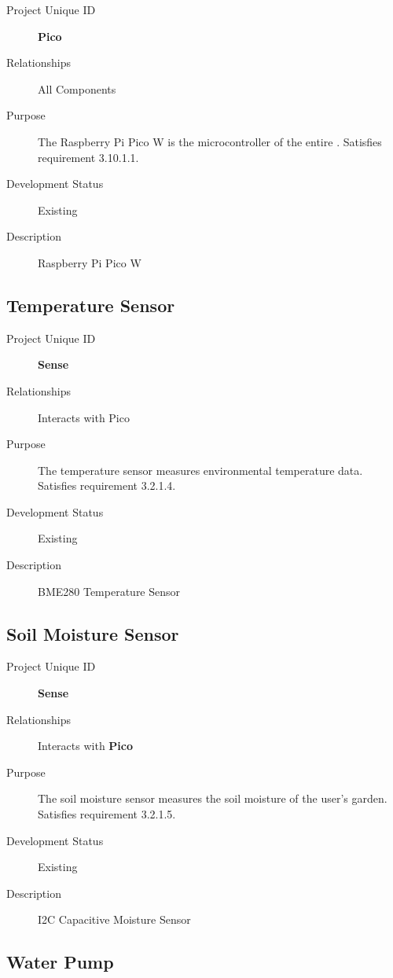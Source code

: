 \begin{description}
    \item[Project Unique ID] \textbf{Pico}
    \item[Relationships] All Components
    \item[Purpose] The Raspberry Pi Pico W is the microcontroller of the entire \ThisSystem. Satisfies requirement 3.10.1.1.
    \item[Development Status] Existing
    \item[Description] Raspberry Pi Pico W
\end{description}

\subsection{Temperature Sensor}

\begin{description}
    \item[Project Unique ID] \textbf{Sense}
    \item[Relationships] Interacts with Pico
    \item[Purpose] The temperature sensor measures environmental temperature data. Satisfies requirement 3.2.1.4.
    \item[Development Status] Existing
    \item[Description] BME280 Temperature Sensor
\end{description}

\subsection{Soil Moisture Sensor}

\begin{description}
    \item[Project Unique ID] \textbf{Sense}
    \item[Relationships] Interacts with \textbf{Pico}
    \item[Purpose] The soil moisture sensor measures the soil moisture of the user's garden. Satisfies requirement 3.2.1.5.
    \item[Development Status] Existing
    \item[Description] I2C Capacitive Moisture Sensor
\end{description}

\subsection{Water Pump}

